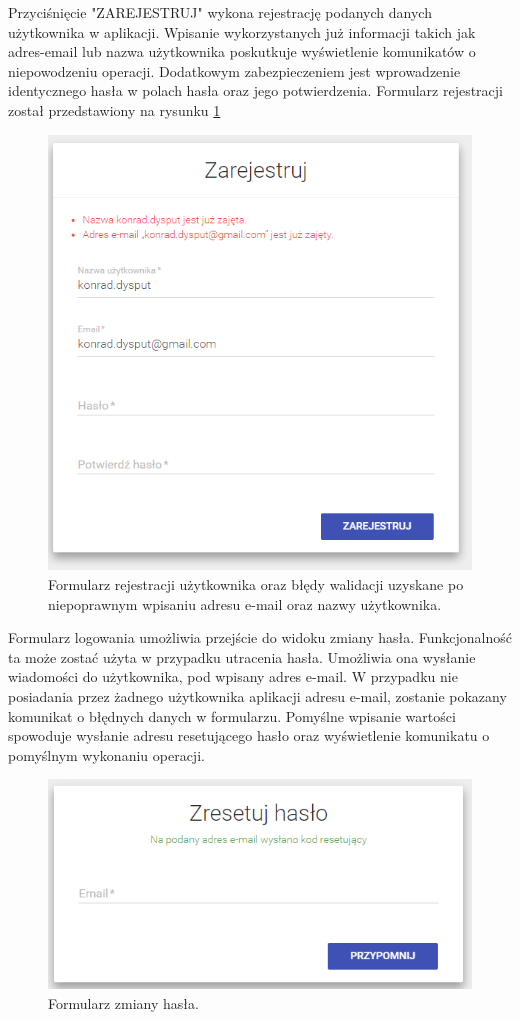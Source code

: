 Przyciśnięcie "ZAREJESTRUJ" wykona rejestrację podanych danych użytkownika w aplikacji. Wpisanie wykorzystanych już informacji takich jak adres-email lub nazwa użytkownika poskutkuje wyświetlenie komunikatów o niepowodzeniu operacji. Dodatkowym zabezpieczeniem jest wprowadzenie identycznego hasła w polach hasła oraz jego potwierdzenia. Formularz rejestracji został przedstawiony na rysunku \ref{fig:7} 
\\
\begin{figure}
	\centering
	\includegraphics[width=0.7\linewidth]{"obrazy/6..2 Rejestracja"}
	\caption{Formularz rejestracji użytkownika oraz błędy walidacji uzyskane po niepoprawnym wpisaniu adresu e-mail oraz nazwy użytkownika.}
	\label{fig:7}
\end{figure}

Formularz logowania umożliwia przejście do widoku zmiany hasła. Funkcjonalność ta może zostać użyta w przypadku utracenia hasła. Umożliwia ona wysłanie wiadomości do użytkownika, pod wpisany adres e-mail. W przypadku nie posiadania przez żadnego użytkownika aplikacji adresu e-mail, zostanie pokazany komunikat o błędnych danych w formularzu. Pomyślne wpisanie wartości spowoduje wysłanie adresu resetującego hasło oraz wyświetlenie komunikatu o pomyślnym wykonaniu operacji.
\begin{figure}[!h]
	\centering
	\includegraphics[width=0.7\linewidth]{"obrazy/6..2 PrzypomnienieHasla"}
	\caption{Formularz zmiany hasła.}
	\label{fig:8}
\end{figure}

